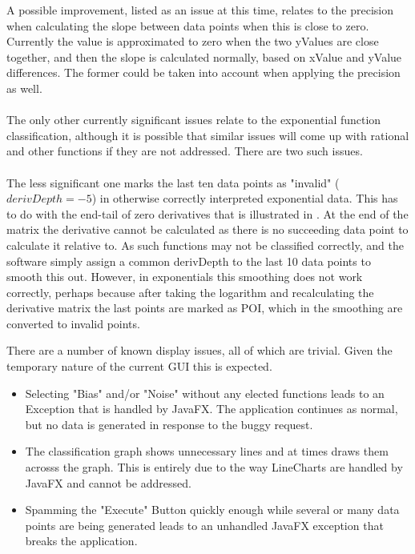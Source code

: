 \documentclass[main.tex]{subfiles}
\begin{document}
      A possible improvement, listed as an issue at this time, relates to the precision when calculating the slope between data points when this is close to zero. Currently the value is approximated to zero when the two yValues are close together, and then the slope is calculated normally, based on xValue and yValue differences. The former could be taken into account when applying the precision as well.
      \\\\
      The only other currently significant issues relate to the exponential function classification, although it is possible that similar issues will come up with rational and other functions if they are not addressed. There are two such issues.
      \\\\
      The less significant one marks the last ten data points as "invalid" ($derivDepth=-5$) in otherwise correctly interpreted exponential data. This has to do with the end-tail  of zero derivatives that is illustrated in . At the end of the matrix the derivative cannot be calculated as there is no succeeding data point to calculate it relative to. As such functions may not be classified correctly, and the software simply assign a common derivDepth to the last 10 data points to smooth this out. However, in exponentials this smoothing does not work correctly, perhaps because after taking the logarithm and recalculating the derivative matrix the last points are marked as POI, which in the smoothing are converted to invalid points.
      
      
      
      There are a number of known display issues, all of which are trivial. Given the temporary nature of the current GUI this is expected.
      \begin{itemize}
        \item Selecting "Bias" and/or "Noise" without any elected functions leads to an Exception that is handled by JavaFX. The application continues as normal, but no data is generated in response to the buggy request.
        \item The classification graph shows unnecessary lines and at times draws them acrosss the graph. This is entirely due to the way LineCharts are handled by JavaFX and cannot be addressed.
        \item Spamming the "Execute" Button quickly enough while several or many data points are being generated leads to an unhandled JavaFX exception that breaks the application.
      \end{itemize}
      
\end{document}
